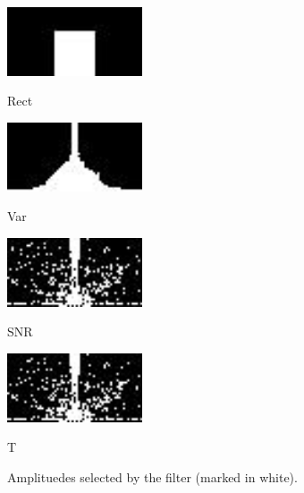 \documentclass{article}
\begin{document}
\begin{figure}[!htb]

\begin{minipage}[b]{.48\linewidth}
  \centering
  \centerline{\includegraphics[width=4.0cm]{filter/rectF_399}}
  \centerline{Rect}\medskip
\end{minipage}
\hfill
\begin{minipage}[b]{0.48\linewidth}
  \centering
  \centerline{\includegraphics[width=4.0cm]{filter/varF_399}}
  \centerline{Var}\medskip
\end{minipage}
%
\begin{minipage}[b]{.48\linewidth}
  \centering
  \centerline{\includegraphics[width=4.0cm]{filter/snrF_399}}
  \centerline{SNR}\medskip
\end{minipage}
\hfill
\begin{minipage}[b]{0.48\linewidth}
  \centering
  \centerline{\includegraphics[width=4.0cm]{filter/tF_399}}
  \centerline{T}\medskip
\end{minipage}
%
\caption{Amplituedes selected by the filter (marked in white).}
\label{fig:spec}
%
\end{figure}
\end{document}
